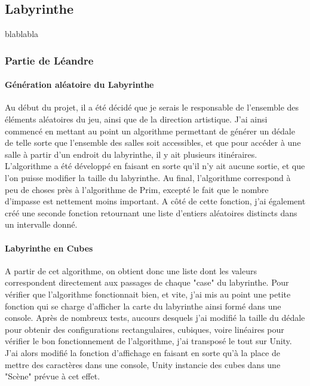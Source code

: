 \documentclass{article}
\begin{document}
\subsection{Labyrinthe}
blablabla
\subsubsection{Partie de Léandre}

\paragraph{Génération aléatoire du Labyrinthe}
Au début du projet, il a été décidé que je serais le responsable de l'ensemble des éléments aléatoires du jeu, ainsi que de la direction artistique. J'ai ainsi commencé en mettant au point un algorithme permettant de générer un dédale de telle sorte que l'ensemble des salles soit accessibles, et que pour accéder à une salle à partir d'un endroit du labyrinthe, il y ait plusieurs itinéraires. L'algorithme a été développé en faisant en sorte qu'il n'y ait aucune sortie, et que l'on puisse modifier la taille du labyrinthe. Au final, l'algorithme correspond à peu de choses près à l'algorithme de Prim, excepté le fait que le nombre d'impasse est nettement moins important. A côté de cette fonction, j'ai également créé une seconde fonction retournant une liste d'entiers aléatoires distincts dans un intervalle donné.

\paragraph{Labyrinthe en Cubes}
A partir de cet algorithme, on obtient donc une liste dont les valeurs correspondent directement aux passages de chaque "case" du labyrinthe. Pour vérifier que l'algorithme fonctionnait bien, et vite, j'ai mis au point une petite fonction qui se charge d'afficher la carte du labyrinthe ainsi formé dans une console. Après de nombreux tests, aucours desquels j'ai modifié la taille du dédale pour obtenir des configurations rectangulaires, cubiques, voire linéaires pour vérifier le bon fonctionnement de l'algorithme, j'ai transposé le tout sur Unity. J'ai alors modifié la fonction d'affichage en faisant en sorte qu'à la place de mettre des caractères dans une console, Unity instancie des cubes dans une "Scène" prévue à cet effet.
\end{document}
